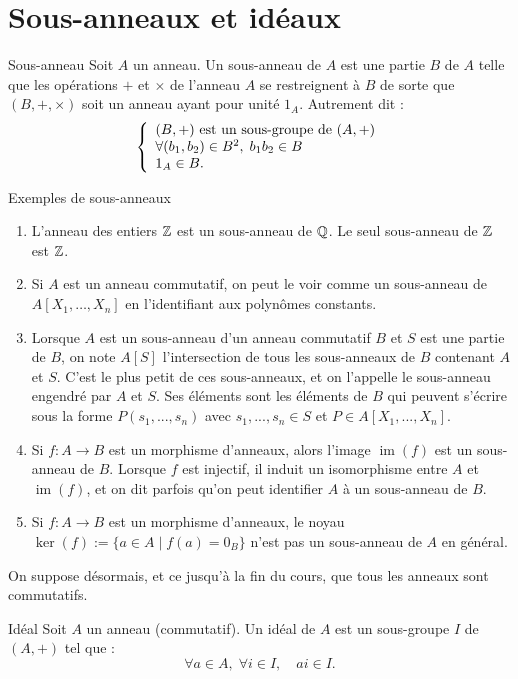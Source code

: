 \documentclass[]{report}
\begin{document}
\section{Sous-anneaux et idéaux}

\begin{df}{Sous-anneau}{}
    Soit $A$ un anneau. Un sous-anneau de $A$ est une partie $B$ de $A$ telle que les opérations $+$ et $\times$ de l'anneau $A$ se restreignent à $B$ de sorte que $(B, +, \times)$ soit un anneau ayant pour unité $1_A$. Autrement dit :
    \[\left\{\begin{array}{ll} (B, +) \text{ est un sous-groupe de } (A, +) \\ \forall (b_1, b_2) \in B^2, \; b_1 b_2 \in B \\ 1_A \in B. \end{array} \right.\]
\end{df}

\begin{ex}{Exemples de sous-anneaux}{}
    \begin{enumerate}
        \item L'anneau des entiers $\mathbb{Z}$ est un sous-anneau de $\mathbb{Q}$. Le seul sous-anneau de $\mathbb{Z}$ est $\mathbb{Z}$.
        \item Si $A$ est un anneau commutatif, on peut le voir comme un sous-anneau de $A[X_1, \ldots, X_n]$ en l'identifiant aux polynômes constants.
        \item Lorsque $A$ est un sous-anneau d'un anneau commutatif $B$ et $S$ est une partie de $B$, on note $A[S]$ l'intersection de tous les sous-anneaux de $B$ contenant $A$ et $S$. C'est le plus petit de ces sous-anneaux, et on l'appelle le sous-anneau engendré par $A$ et $S$. Ses éléments sont les éléments de $B$ qui peuvent s'écrire sous la forme $P(s_1, ..., s_n)$ avec $s_1, ..., s_n \in S$ et $P \in A[X_1, ..., X_n]$.
        \item Si $f : A \to B$ est un morphisme d'anneaux, alors l'image $\operatorname{im}(f)$ est un sous-anneau de $B$. Lorsque $f$ est injectif, il induit un isomorphisme entre $A$ et $\operatorname{im}(f)$, et on dit parfois qu'on peut identifier $A$ à un sous-anneau de $B$.
        \item Si $f : A \to B$ est un morphisme d'anneaux, le noyau $\ker(f) := \{a \in A \mid f(a) = 0_B\}$ n'est pas un sous-anneau de $A$ en général.
    \end{enumerate}
\end{ex}

On suppose désormais, et ce jusqu'à la fin du cours, que tous les anneaux sont commutatifs.

\begin{df}{Idéal}{}
    Soit $A$ un anneau (commutatif). Un idéal de $A$ est un sous-groupe $I$ de $(A, +)$ tel que :
    \[\forall a \in A, \; \forall i \in I, \quad ai \in I.\]
\end{df}
\end{document}

